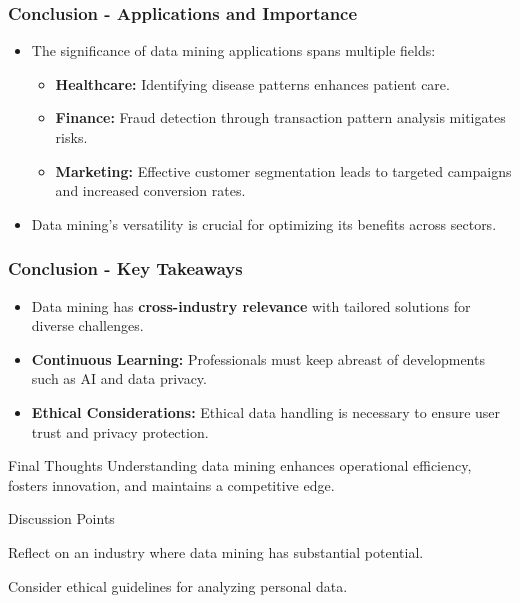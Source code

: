 \documentclass[aspectratio=169]{beamer}
\begin{document}
\begin{frame}[fragile]
    \frametitle{Conclusion - Applications and Importance}
    \begin{itemize}
        \item The significance of data mining applications spans multiple fields:
            \begin{itemize}
                \item \textbf{Healthcare:} Identifying disease patterns enhances patient care.
                \item \textbf{Finance:} Fraud detection through transaction pattern analysis mitigates risks.
                \item \textbf{Marketing:} Effective customer segmentation leads to targeted campaigns and increased conversion rates.
            \end{itemize}
        \item Data mining's versatility is crucial for optimizing its benefits across sectors.
    \end{itemize}
\end{frame}

\begin{frame}[fragile]
    \frametitle{Conclusion - Key Takeaways}
    \begin{itemize}
        \item Data mining has \textbf{cross-industry relevance} with tailored solutions for diverse challenges.
        \item \textbf{Continuous Learning:} Professionals must keep abreast of developments such as AI and data privacy.
        \item \textbf{Ethical Considerations:} Ethical data handling is necessary to ensure user trust and privacy protection.
    \end{itemize}
    
    \begin{block}{Final Thoughts}
        Understanding data mining enhances operational efficiency, fosters innovation, and maintains a competitive edge.
    \end{block}

    \begin{block}{Discussion Points}
        \item Reflect on an industry where data mining has substantial potential.
        \item Consider ethical guidelines for analyzing personal data.
    \end{block}
\end{frame}
\end{document}
